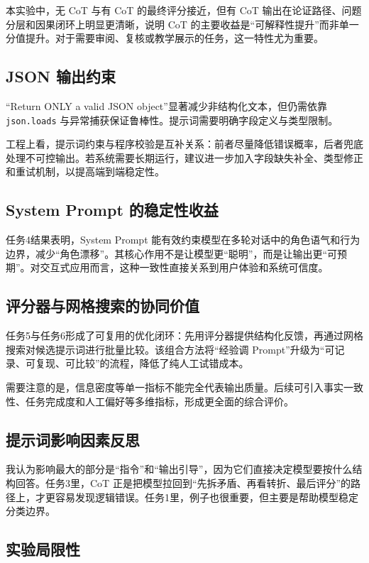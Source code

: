 \documentclass[UTF8, a4paper, 12pt]{ctexart}
\begin{document}
本实验中，无 CoT 与有 CoT 的最终评分接近，但有 CoT 输出在论证路径、问题分层和因果闭环上明显更清晰，说明 CoT 的主要收益是“可解释性提升”而非单一分值提升。对于需要审阅、复核或教学展示的任务，这一特性尤为重要。

\subsection{JSON 输出约束}

“Return ONLY a valid JSON object”显著减少非结构化文本，但仍需依靠 \texttt{json.loads} 与异常捕获保证鲁棒性。提示词需要明确字段定义与类型限制。

工程上看，提示词约束与程序校验是互补关系：前者尽量降低错误概率，后者兜底处理不可控输出。若系统需要长期运行，建议进一步加入字段缺失补全、类型修正和重试机制，以提高端到端稳定性。

\subsection{System Prompt 的稳定性收益}

任务4结果表明，System Prompt 能有效约束模型在多轮对话中的角色语气和行为边界，减少“角色漂移”。其核心作用不是让模型更“聪明”，而是让输出更“可预期”。对交互式应用而言，这种一致性直接关系到用户体验和系统可信度。

\subsection{评分器与网格搜索的协同价值}

任务5与任务6形成了可复用的优化闭环：先用评分器提供结构化反馈，再通过网格搜索对候选提示词进行批量比较。该组合方法将“经验调 Prompt”升级为“可记录、可复现、可比较”的流程，降低了纯人工试错成本。

需要注意的是，信息密度等单一指标不能完全代表输出质量。后续可引入事实一致性、任务完成度和人工偏好等多维指标，形成更全面的综合评价。

\subsection{提示词影响因素反思}

我认为影响最大的部分是“指令”和“输出引导”，因为它们直接决定模型要按什么结构回答。任务3里，CoT 正是把模型拉回到“先拆矛盾、再看转折、最后评分”的路径上，才更容易发现逻辑错误。任务1里，例子也很重要，但主要是帮助模型稳定分类边界。

\subsection{实验局限性}
\end{document}
